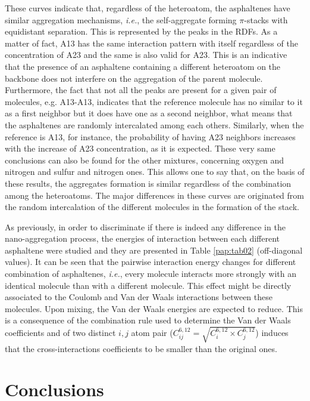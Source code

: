 These curves indicate that, regardless of the heteroatom, the asphaltenes have similar aggregation mechanisms, \textit{i.e.}, the self-aggregate forming $\pi$-stacks with equidistant separation. This is represented by the peaks in the RDFs. As a matter of fact, A13 has the same interaction pattern with itself regardless of the concentration of A23 and the same is also valid for A23. This is an indicative that the presence of an asphaltene containing a different heteroatom on the backbone does not interfere on the aggregation of the parent molecule. Furthermore, the fact that not all the peaks are present for a given pair of molecules, e.g. A13-A13, indicates that the reference molecule has no similar to it as a first neighbor but it does have one as a second neighbor, what means that the asphaltenes are randomly intercalated among each others. Similarly, when the reference is A13, for instance, the probability of having A23 neighbors increases with the increase of A23 concentration, as it is expected. These very same conclusions can also be found for the other mixtures, concerning oxygen and nitrogen and sulfur and nitrogen ones.  This allows one to say that, on the basis of these results, the aggregates formation is similar regardless of the combination among the heteroatoms. The major differences in these curves are originated from the random intercalation of the different molecules in the formation of the stack. 

As previously, in order to discriminate if there is indeed any difference in the nano-aggregation process, the energies of interaction between each different asphaltene were studied and they are presented in Table \ref{pap:tab02} (off-diagonal values). It can be seen that the pairwise interaction energy changes for different combination of asphaltenes, \textit{i.e.}, every molecule interacts more strongly with an identical molecule than with a different molecule. This effect might be directly associated to the Coulomb and Van der Waals interactions between these molecules. Upon mixing, the Van der Waals energies are expected to reduce. This is a consequence of the combination rule used to determine the Van der Waals coefficients  and  of two distinct $i,j$ atom pair ($C^{6,12}_{ij}=\sqrt{C^{6,12}_i \times C^{6,12}_j}$) induces that the cross-interactions coefficients to be smaller than the original ones. 

\section{Conclusions}

